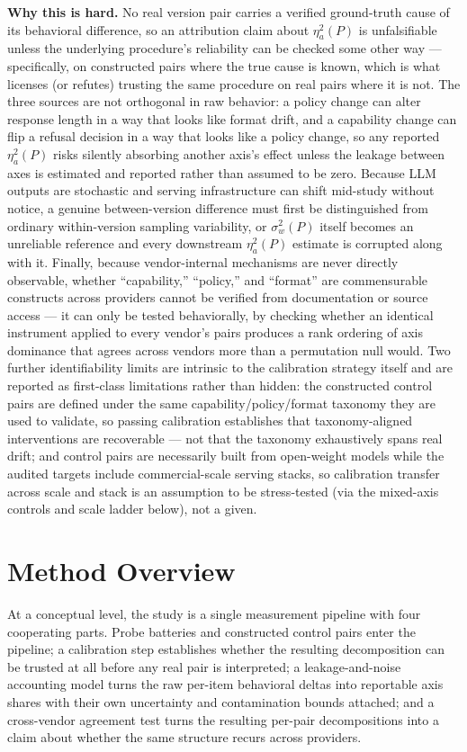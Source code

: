 \documentclass[11pt]{article}
\begin{document}
\noindent\textbf{Why this is hard.} No real version pair carries a verified ground-truth cause of its behavioral difference, so an attribution claim about $\eta^2_a(P)$ is unfalsifiable unless the underlying procedure's reliability can be checked some other way --- specifically, on constructed pairs where the true cause is known, which is what licenses (or refutes) trusting the same procedure on real pairs where it is not. The three sources are not orthogonal in raw behavior: a policy change can alter response length in a way that looks like format drift, and a capability change can flip a refusal decision in a way that looks like a policy change, so any reported $\eta^2_a(P)$ risks silently absorbing another axis's effect unless the leakage between axes is estimated and reported rather than assumed to be zero. Because LLM outputs are stochastic and serving infrastructure can shift mid-study without notice, a genuine between-version difference must first be distinguished from ordinary within-version sampling variability, or $\sigma^2_w(P)$ itself becomes an unreliable reference and every downstream $\eta^2_a(P)$ estimate is corrupted along with it. Finally, because vendor-internal mechanisms are never directly observable, whether ``capability,'' ``policy,'' and ``format'' are commensurable constructs across providers cannot be verified from documentation or source access --- it can only be tested behaviorally, by checking whether an identical instrument applied to every vendor's pairs produces a rank ordering of axis dominance that agrees across vendors more than a permutation null would. Two further identifiability limits are intrinsic to the calibration strategy itself and are reported as first-class limitations rather than hidden: the constructed control pairs are defined under the same capability/policy/format taxonomy they are used to validate, so passing calibration establishes that taxonomy-aligned interventions are recoverable --- not that the taxonomy exhaustively spans real drift; and control pairs are necessarily built from open-weight models while the audited targets include commercial-scale serving stacks, so calibration transfer across scale and stack is an assumption to be stress-tested (via the mixed-axis controls and scale ladder below), not a given.

\section{Method Overview}

At a conceptual level, the study is a single measurement pipeline with four cooperating parts. Probe batteries and constructed control pairs enter the pipeline; a calibration step establishes whether the resulting decomposition can be trusted at all before any real pair is interpreted; a leakage-and-noise accounting model turns the raw per-item behavioral deltas into reportable axis shares with their own uncertainty and contamination bounds attached; and a cross-vendor agreement test turns the resulting per-pair decompositions into a claim about whether the same structure recurs across providers.
\end{document}
